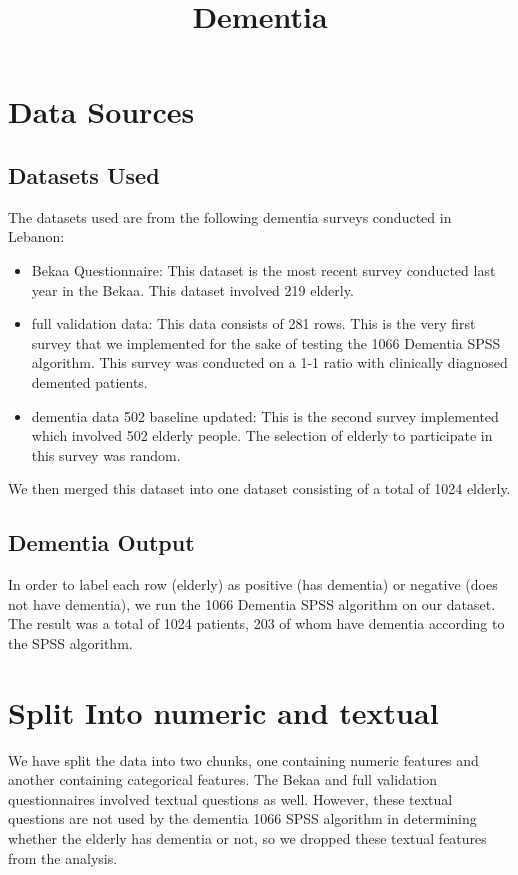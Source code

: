 \documentclass{article}
\title{Dementia}
\begin{document}
\maketitle

\tableofcontents

\section{Data Sources}
\subsection{Datasets Used}
The datasets used are from the following dementia surveys conducted in Lebanon:
\begin{itemize}
    \item Bekaa Questionnaire: This dataset is the most recent survey conducted last year in the Bekaa. This dataset involved 219 elderly.
    \item full validation data: This data consists of 281 rows. This is the very first survey that we implemented for the sake of testing the 1066 Dementia SPSS algorithm. This survey was conducted on a 1-1 ratio with clinically diagnosed demented patients.
    \item dementia data 502 baseline updated: This is the second survey implemented which involved 502 elderly people. The selection of elderly to participate in this survey was random.
\end{itemize}
We then merged this dataset into one dataset consisting of a total of 1024 elderly.

\subsection{Dementia Output}
In order to label each row (elderly) as positive (has dementia) or negative (does not have dementia), we run the 1066 Dementia SPSS algorithm on our dataset. The result was a total of 1024 patients, 203 of whom have dementia according to the SPSS algorithm.

\section{Split Into numeric and textual}
We have split the data into two chunks, one containing numeric features and another containing categorical features. The Bekaa and full validation questionnaires involved textual questions as well. However, these textual questions are not used by the dementia 1066 SPSS algorithm in determining whether the elderly has dementia or not, so we dropped these textual features from the analysis.
\end{document}
